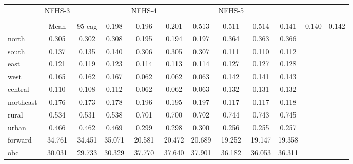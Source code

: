 {
\def\sym#1{\ifmmode^{#1}\else\(^{#1}\)\fi}
\begin{tabular}{l*{3}{ccc}}
\toprule
                    &      NFHS-3&            &            &      NFHS-4&            &            &      NFHS-5&            &            \\
                    &                  &                  &                  \\
                    &        Mean&95%
\midrule
eag                 &       0.198&       0.196&       0.201&       0.513&       0.511&       0.514&       0.141&       0.140&       0.142\\
north               &       0.305&       0.302&       0.308&       0.195&       0.194&       0.197&       0.364&       0.363&       0.366\\
south               &       0.137&       0.135&       0.140&       0.306&       0.305&       0.307&       0.111&       0.110&       0.112\\
east                &       0.121&       0.119&       0.123&       0.114&       0.113&       0.114&       0.127&       0.127&       0.128\\
west                &       0.165&       0.162&       0.167&       0.062&       0.062&       0.063&       0.142&       0.141&       0.143\\
central             &       0.110&       0.108&       0.112&       0.062&       0.062&       0.063&       0.132&       0.131&       0.132\\
northeast           &       0.176&       0.173&       0.178&       0.196&       0.195&       0.197&       0.117&       0.117&       0.118\\
rural               &       0.534&       0.531&       0.538&       0.701&       0.700&       0.702&       0.744&       0.743&       0.745\\
urban               &       0.466&       0.462&       0.469&       0.299&       0.298&       0.300&       0.256&       0.255&       0.257\\
forward             &      34.761&      34.451&      35.071&      20.581&      20.472&      20.689&      19.252&      19.147&      19.358\\
obc                 &      30.031&      29.733&      30.329&      37.770&      37.640&      37.901&      36.182&      36.053&      36.311\\

\end{tabular}}
